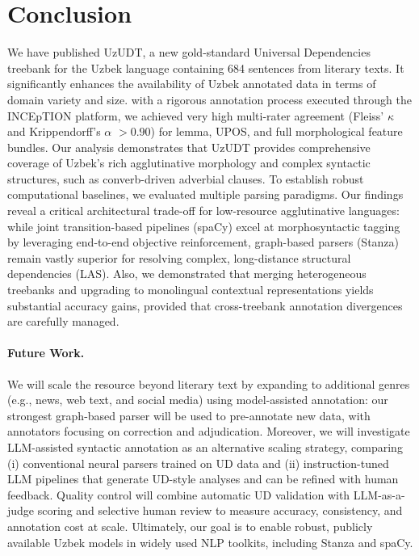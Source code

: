 \documentclass[10pt, a4paper]{article}
\begin{document}
\section{Conclusion}
\label{sec:conclusion}

We have published UzUDT, a new gold-standard Universal Dependencies treebank for the Uzbek language containing 684 sentences from literary texts. It significantly enhances the availability of Uzbek annotated data in terms of domain variety and size. with a rigorous annotation process executed through the INCEpTION platform, we achieved very high multi-rater agreement (Fleiss' $\kappa$ and Krippendorff's $\alpha$ $>0.90$) for lemma, UPOS, and full morphological feature bundles. Our analysis demonstrates that UzUDT provides comprehensive coverage of Uzbek’s rich agglutinative morphology and complex syntactic structures, such as converb-driven adverbial clauses.
To establish robust computational baselines, we evaluated multiple parsing paradigms. Our findings reveal a critical architectural trade-off for low-resource agglutinative languages: while joint transition-based pipelines (spaCy) excel at morphosyntactic tagging by leveraging end-to-end objective reinforcement, graph-based parsers (Stanza) remain vastly superior for resolving complex, long-distance structural dependencies (LAS). Also, we demonstrated that merging heterogeneous treebanks and upgrading to monolingual contextual representations yields substantial accuracy gains, provided that cross-treebank annotation divergences are carefully managed.


\paragraph{Future Work.}
 We will scale the resource beyond literary text by expanding to additional genres (e.g., news, web text, and social media) using model-assisted annotation: our strongest graph-based parser will be used to pre-annotate new data, with annotators focusing on correction and adjudication.
Moreover, we will investigate LLM-assisted syntactic annotation\cite{schroeder-etal-2025-just} as an alternative scaling strategy, comparing (i) conventional neural parsers trained on UD data and (ii) instruction-tuned LLM pipelines that generate UD-style analyses and can be refined with human feedback.
Quality control will combine automatic UD validation with LLM-as-a-judge\cite{10.1145/3701716.3715265} scoring and selective human review to measure accuracy, consistency, and annotation cost at scale.
Ultimately, our goal is to enable robust, publicly available Uzbek models in widely used NLP toolkits, including Stanza and spaCy.
\end{document}
